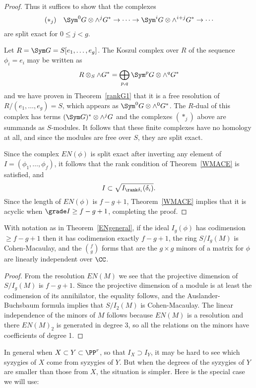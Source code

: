 \begin{proof}
Thus it suffices to show that the complexes
$$
\begin{aligned}
 (*_{j}) \quad \Sym^{0}G\otimes\wedge^{j}G^{*}\to\cdots \to \Sym^{i}G \otimes  \wedge^{i+j}G^{*}  \to \cdots
\end{aligned}
$$
are split exact for $0\leq j<g$.

Let $R = \Sym G = S[e_{1}, \dots, e_{g}]$. The Koszul complex over $R$ of the sequence $\phi_{i} = e_{i}$
may be written as
$$
R\otimes_{S} \wedge G^* = \bigoplus_{p,q}\Sym^{p}G\otimes\wedge^{q}G^*
$$
and we have proven in Theorem~\ref{rankG1} that it is a free resolution of $R/(e_1, \dots, e_g)=S$, which appears
as $\Sym^{0}G\otimes \wedge^{0}G^*$. The $R$-dual of this complex has terms
$(\Sym G)^*\otimes\wedge^{j}G$
and the complexes $(*_{j})$ above are summands as $S$-modules. It follows that these finite
complexes have no homology at all, and since the modules are free over $S$, they are split exact.

Since the 
complex $EN(\phi)$ is split exact after inverting any element of $I = (\phi_{1}, \dots, \phi_{f})$, it follows that 
the rank condition of Theorem~\ref{WMACE} is satisfied, and
$$
I \subset \sqrt{I_{\rank \delta_{i}}(\delta_{i})}. 
$$
Since the length of $EN(\phi)$  is $f-g+1$, Theorem~\ref{WMACE} implies that
it is acyclic when $\grade I\geq f-g+1$, completing the proof.
\end{proof}

\begin{corollary}\label{E-N cor}
With notation as in Theorem~\ref{ENgeneral}, if the ideal $I_g(\phi)$ has codimension $\geq f-g+1$ then it has
codimension exactly $f-g+1$, the ring $S/I_g(M)$ is Cohen-Macaulay, and the $\binom{f}{g}$ forms
that are the $g\times g$ minors of a matrix for $\phi$ are linearly independent over $\CC$.
\end{corollary}

\begin{proof}
From the resolution $EN(M)$ we see that the projective dimension of $S/I_g(M)$ is $f-g+1$. Since the projective dimension of a module
is at least the codimension of its annihilator, the equality follows, and the Auslander-Buchsbaum formula implies that $S/I_2(M)$ is 
Cohen-Macaulay. The linear independence of the minors of $M$ follows because $EN(M)$ is a resolution and there
$EN(M)_2$ is generated in degree 3, so all the relations on the minors have coefficients of degree 1.
\end{proof}


In general when $X\subset Y\subset \PP^r$, so that $I_X \supset I_Y$, it may be hard to see which syzygies of $X$ come
from syzygies of $Y$. But when the degrees of the syzygies of $Y$ are smaller than those from $X$, the situation is simpler.
Here is the special case we will use:

